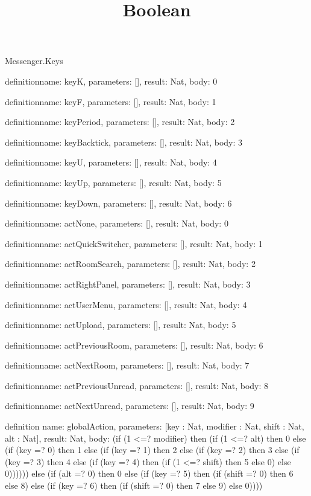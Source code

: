 \begin{lexlean}{Messenger.Keys}
\title{Boolean}
\begin{semanticmodule}
definition{name: keyK, parameters: [], result: Nat, body: 0}

definition{name: keyF, parameters: [], result: Nat, body: 1}

definition{name: keyPeriod, parameters: [], result: Nat, body: 2}

definition{name: keyBacktick, parameters: [], result: Nat, body: 3}

definition{name: keyU, parameters: [], result: Nat, body: 4}

definition{name: keyUp, parameters: [], result: Nat, body: 5}

definition{name: keyDown, parameters: [], result: Nat, body: 6}

definition{name: actNone, parameters: [], result: Nat, body: 0}

definition{name: actQuickSwitcher, parameters: [], result: Nat, body: 1}

definition{name: actRoomSearch, parameters: [], result: Nat, body: 2}

definition{name: actRightPanel, parameters: [], result: Nat, body: 3}

definition{name: actUserMenu, parameters: [], result: Nat, body: 4}

definition{name: actUpload, parameters: [], result: Nat, body: 5}

definition{name: actPreviousRoom, parameters: [], result: Nat, body: 6}

definition{name: actNextRoom, parameters: [], result: Nat, body: 7}

definition{name: actPreviousUnread, parameters: [], result: Nat, body: 8}

definition{name: actNextUnread, parameters: [], result: Nat, body: 9}

definition{
  name: globalAction,
  parameters: [key : Nat, modifier : Nat, shift : Nat, alt : Nat],
  result: Nat,
  body: (if (1 <=? modifier) then (if (1 <=? alt) then 0 else (if (key =? 0) then 1 else (if (key =? 1) then 2 else (if (key =? 2) then 3 else (if (key =? 3) then 4 else (if (key =? 4) then (if (1 <=? shift) then 5 else 0) else 0)))))) else (if (alt =? 0) then 0 else (if (key =? 5) then (if (shift =? 0) then 6 else 8) else (if (key =? 6) then (if (shift =? 0) then 7 else 9) else 0))))
}


\end{semanticmodule}
\end{lexlean}
